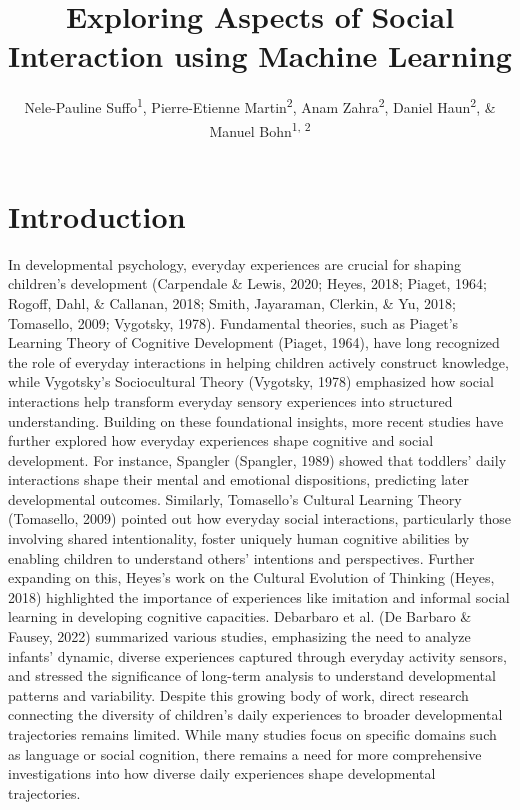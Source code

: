 \documentclass[
  man,floatsintext]{apa6}
\title{Exploring Aspects of Social Interaction using Machine Learning}
\author{Nele-Pauline Suffo\textsuperscript{1}, Pierre-Etienne Martin\textsuperscript{2}, Anam Zahra\textsuperscript{2}, Daniel Haun\textsuperscript{2}, \& Manuel Bohn\textsuperscript{1, 2}}
\date{}
\affiliation{\vspace{0.5cm}\textsuperscript{1} Institute of Psychology in Education, Leuphana University Lüneburg\\\textsuperscript{2} Max Planck Institute for Evolutionary Anthropology}
\begin{document}
\maketitle

\section{Introduction}\label{introduction}

In developmental psychology, everyday experiences are crucial for shaping children's development (Carpendale \& Lewis, 2020; Heyes, 2018; Piaget, 1964; Rogoff, Dahl, \& Callanan, 2018; Smith, Jayaraman, Clerkin, \& Yu, 2018; Tomasello, 2009; Vygotsky, 1978). Fundamental theories, such as Piaget's Learning Theory of Cognitive Development (Piaget, 1964), have long recognized the role of everyday interactions in helping children actively construct knowledge, while Vygotsky's Sociocultural Theory (Vygotsky, 1978) emphasized how social interactions help transform everyday sensory experiences into structured understanding. Building on these foundational insights, more recent studies have further explored how everyday experiences shape cognitive and social development. For instance, Spangler (Spangler, 1989) showed that toddlers' daily interactions shape their mental and emotional dispositions, predicting later developmental outcomes. Similarly, Tomasello's Cultural Learning Theory (Tomasello, 2009) pointed out how everyday social interactions, particularly those involving shared intentionality, foster uniquely human cognitive abilities by enabling children to understand others' intentions and perspectives. Further expanding on this, Heyes's work on the Cultural Evolution of Thinking (Heyes, 2018) highlighted the importance of experiences like imitation and informal social learning in developing cognitive capacities. Debarbaro et al. (De Barbaro \& Fausey, 2022) summarized various studies, emphasizing the need to analyze infants' dynamic, diverse experiences captured through everyday activity sensors, and stressed the significance of long-term analysis to understand developmental patterns and variability. Despite this growing body of work, direct research connecting the diversity of children's daily experiences to broader developmental trajectories remains limited. While many studies focus on specific domains such as language or social cognition, there remains a need for more comprehensive investigations into how diverse daily experiences shape developmental trajectories.
\end{document}

